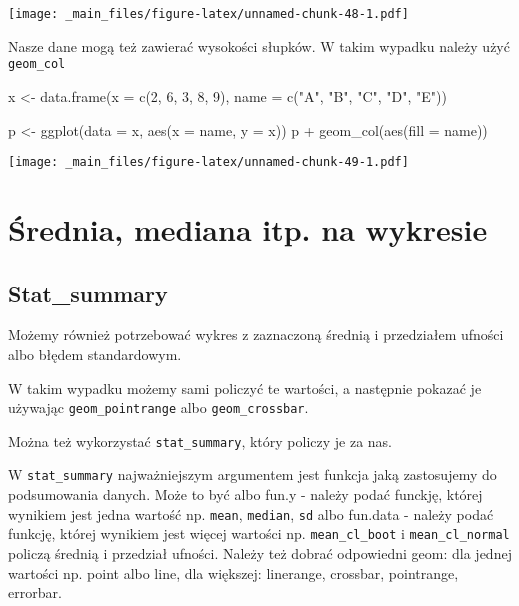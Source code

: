 \documentclass[
]{book}
\newenvironment{Shaded}{\begin{snugshade}}{\end{snugshade}}
\newcommand{\AttributeTok}[1]{\textcolor[rgb]{0.77,0.63,0.00}{#1}}
\newcommand{\DecValTok}[1]{\textcolor[rgb]{0.00,0.00,0.81}{#1}}
\newcommand{\FunctionTok}[1]{\textcolor[rgb]{0.00,0.00,0.00}{#1}}
\newcommand{\NormalTok}[1]{#1}
\newcommand{\OtherTok}[1]{\textcolor[rgb]{0.56,0.35,0.01}{#1}}
\newcommand{\SpecialCharTok}[1]{\textcolor[rgb]{0.00,0.00,0.00}{#1}}
\newcommand{\StringTok}[1]{\textcolor[rgb]{0.31,0.60,0.02}{#1}}
\begin{document}
\texttt{[image: \_main\_files/figure-latex/unnamed-chunk-48-1.pdf]}

Nasze dane mogą też zawierać wysokości słupków. W takim wypadku należy użyć \texttt{geom\_col}

\begin{Shaded}
\begin{Highlighting}[]
\NormalTok{x }\OtherTok{\textless{}{-}} \FunctionTok{data.frame}\NormalTok{(}\AttributeTok{x =} \FunctionTok{c}\NormalTok{(}\DecValTok{2}\NormalTok{, }\DecValTok{6}\NormalTok{, }\DecValTok{3}\NormalTok{, }\DecValTok{8}\NormalTok{, }\DecValTok{9}\NormalTok{), }\AttributeTok{name =} \FunctionTok{c}\NormalTok{(}\StringTok{"A"}\NormalTok{, }\StringTok{"B"}\NormalTok{, }\StringTok{"C"}\NormalTok{, }\StringTok{"D"}\NormalTok{, }\StringTok{"E"}\NormalTok{))}

\NormalTok{p }\OtherTok{\textless{}{-}} \FunctionTok{ggplot}\NormalTok{(}\AttributeTok{data =}\NormalTok{ x, }\FunctionTok{aes}\NormalTok{(}\AttributeTok{x =}\NormalTok{ name, }\AttributeTok{y =}\NormalTok{ x))}
\NormalTok{p }\SpecialCharTok{+} \FunctionTok{geom\_col}\NormalTok{(}\FunctionTok{aes}\NormalTok{(}\AttributeTok{fill =}\NormalTok{ name))}
\end{Highlighting}
\end{Shaded}

\texttt{[image: \_main\_files/figure-latex/unnamed-chunk-49-1.pdf]}

\hypertarget{ux15brednia-mediana-itp.-na-wykresie}{%
\section{Średnia, mediana itp. na wykresie}\label{ux15brednia-mediana-itp.-na-wykresie}}

\hypertarget{stat_summary}{%
\subsection{Stat\_summary}\label{stat_summary}}

Możemy również potrzebować wykres z zaznaczoną średnią i przedziałem ufności albo błędem standardowym.

W takim wypadku możemy sami policzyć te wartości, a następnie pokazać je używając \texttt{geom\_pointrange} albo \texttt{geom\_crossbar}.

Można też wykorzystać \texttt{stat\_summary}, który policzy je za nas.

W \texttt{stat\_summary} najważniejszym argumentem jest funkcja jaką zastosujemy do podsumowania danych. Może to być albo fun.y - należy podać funckję, której wynikiem jest jedna wartość np. \texttt{mean}, \texttt{median}, \texttt{sd} albo fun.data - należy podać funkcję, której wynikiem jest więcej wartości np. \texttt{mean\_cl\_boot} i \texttt{mean\_cl\_normal} policzą średnią i przedział ufności. Należy też dobrać odpowiedni geom: dla jednej wartości np. point albo line, dla większej: linerange, crossbar, pointrange, errorbar.
\end{document}

